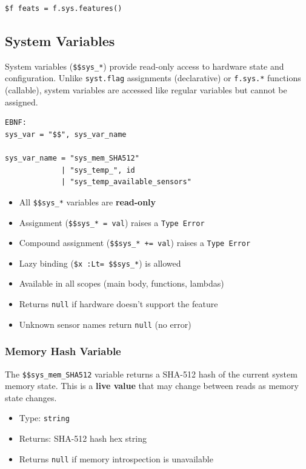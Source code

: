 \begin{verbatim}
$f feats = f.sys.features()
\end{verbatim}

\subsection{System Variables}
System variables (\texttt{\$\$sys\_*}) provide read-only access to hardware state and configuration. Unlike \texttt{syst.flag} assignments (declarative) or \texttt{f.sys.*} functions (callable), system variables are accessed like regular variables but cannot be assigned.

\begin{verbatim}
EBNF:
sys_var = "$$", sys_var_name

sys_var_name = "sys_mem_SHA512"
             | "sys_temp_", id
             | "sys_temp_available_sensors"
\end{verbatim}

\begin{itemize}
\item All \texttt{\$\$sys\_*} variables are \textbf{read-only}
\item Assignment (\texttt{\$\$sys\_* = val}) raises a \texttt{Type Error}
\item Compound assignment (\texttt{\$\$sys\_* += val}) raises a \texttt{Type Error}
\item Lazy binding (\texttt{\$x :Lt= \$\$sys\_*}) is allowed
\item Available in all scopes (main body, functions, lambdas)
\item Returns \texttt{null} if hardware doesn't support the feature
\item Unknown sensor names return \texttt{null} (no error)
\end{itemize}

\subsubsection{Memory Hash Variable}
The \texttt{\$\$sys\_mem\_SHA512} variable returns a SHA-512 hash of the current system memory state. This is a \textbf{live value} that may change between reads as memory state changes.

\begin{itemize}
\item Type: \texttt{string}
\item Returns: SHA-512 hash hex string
\item Returns \texttt{null} if memory introspection is unavailable
\end{itemize}

